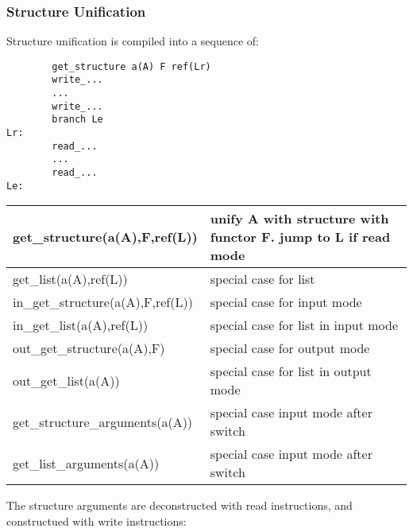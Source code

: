 \subsubsection{Structure Unification}

Structure unification is compiled into a sequence of:
\begin{verbatim}
        get_structure a(A) F ref(Lr)
        write_...
        ...
        write_...
        branch Le
Lr:
        read_...
        ...
        read_...
Le:
\end{verbatim}

\begin{tabular}{|l|l|}
\hline
get_structure(a(A),F,ref(L))    & unify A with structure with functor F.
                                  jump to L if read mode\\
\hline
get_list(a(A),ref(L))           & special case for list   \\
in_get_structure(a(A),F,ref(L))         &        special case for input mode      \\
in_get_list(a(A),ref(L))        & special case for list in input mode             \\
out_get_structure(a(A),F)       & special case for output mode                    \\
out_get_list(a(A))              &  special case for list in output mode           \\
get_structure_arguments(a(A))   & special case input mode after switch            \\
get_list_arguments(a(A))        & special case input mode after switch            \\
\hline
\end{tabular}

The structure arguments are deconstructed with read instructions,
and constructued with write instructions:

